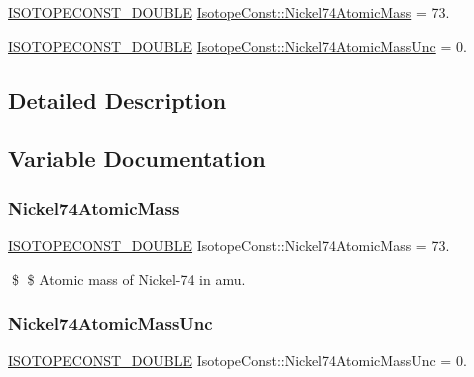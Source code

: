 \begin{DoxyCompactItemize}
\item 
\mbox{\hyperlink{group___isotope_const-_macros_ga8f45a7272ce02c0b4c65c44636ed719a}{I\+S\+O\+T\+O\+P\+E\+C\+O\+N\+S\+T\+\_\+\+D\+O\+U\+B\+LE}} \mbox{\hyperlink{group___isotope_const-_nickel-_ni74_ga09baa57feb7cd6eadb3983e152c8ed61}{Isotope\+Const\+::\+Nickel74\+Atomic\+Mass}} = 73.
\item 
\mbox{\hyperlink{group___isotope_const-_macros_ga8f45a7272ce02c0b4c65c44636ed719a}{I\+S\+O\+T\+O\+P\+E\+C\+O\+N\+S\+T\+\_\+\+D\+O\+U\+B\+LE}} \mbox{\hyperlink{group___isotope_const-_nickel-_ni74_gac8d169145647a53bf4d5b92ada70ecc6}{Isotope\+Const\+::\+Nickel74\+Atomic\+Mass\+Unc}} = 0.
\end{DoxyCompactItemize}


\subsection{Detailed Description}


\subsection{Variable Documentation}
\mbox{\label{group___isotope_const-_nickel-_ni74_ga09baa57feb7cd6eadb3983e152c8ed61}} 
\subsubsection{\texorpdfstring{Nickel74\+Atomic\+Mass}{Nickel74AtomicMass}}
{\footnotesize\ttfamily \mbox{\hyperlink{group___isotope_const-_macros_ga8f45a7272ce02c0b4c65c44636ed719a}{I\+S\+O\+T\+O\+P\+E\+C\+O\+N\+S\+T\+\_\+\+D\+O\+U\+B\+LE}} Isotope\+Const\+::\+Nickel74\+Atomic\+Mass = 73.}

\$ \$ Atomic mass of Nickel-\/74 in amu. \mbox{\label{group___isotope_const-_nickel-_ni74_gac8d169145647a53bf4d5b92ada70ecc6}} 
\subsubsection{\texorpdfstring{Nickel74\+Atomic\+Mass\+Unc}{Nickel74AtomicMassUnc}}
{\footnotesize\ttfamily \mbox{\hyperlink{group___isotope_const-_macros_ga8f45a7272ce02c0b4c65c44636ed719a}{I\+S\+O\+T\+O\+P\+E\+C\+O\+N\+S\+T\+\_\+\+D\+O\+U\+B\+LE}} Isotope\+Const\+::\+Nickel74\+Atomic\+Mass\+Unc = 0.}

